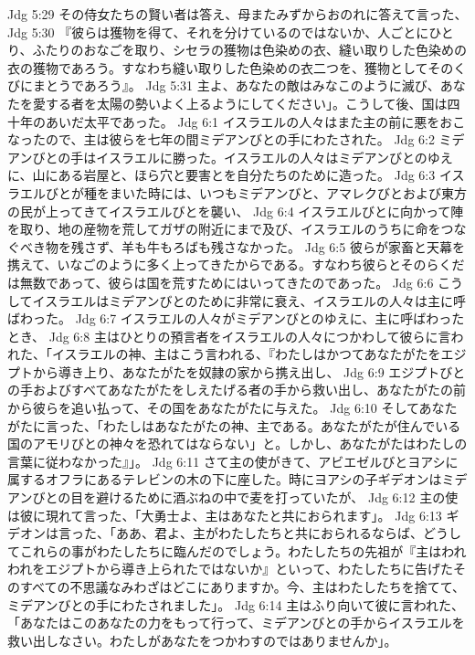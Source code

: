 Jdg 5:29  その侍女たちの賢い者は答え、母またみずからおのれに答えて言った、
Jdg 5:30  『彼らは獲物を得て、それを分けているのではないか、人ごとにひとり、ふたりのおなごを取り、シセラの獲物は色染めの衣、縫い取りした色染めの衣の獲物であろう。すなわち縫い取りした色染めの衣二つを、獲物としてそのくびにまとうであろう』。
Jdg 5:31  主よ、あなたの敵はみなこのように滅び、あなたを愛する者を太陽の勢いよく上るようにしてください」。こうして後、国は四十年のあいだ太平であった。
Jdg 6:1  イスラエルの人々はまた主の前に悪をおこなったので、主は彼らを七年の間ミデアンびとの手にわたされた。
Jdg 6:2  ミデアンびとの手はイスラエルに勝った。イスラエルの人々はミデアンびとのゆえに、山にある岩屋と、ほら穴と要害とを自分たちのために造った。
Jdg 6:3  イスラエルびとが種をまいた時には、いつもミデアンびと、アマレクびとおよび東方の民が上ってきてイスラエルびとを襲い、
Jdg 6:4  イスラエルびとに向かって陣を取り、地の産物を荒してガザの附近にまで及び、イスラエルのうちに命をつなぐべき物を残さず、羊も牛もろばも残さなかった。
Jdg 6:5  彼らが家畜と天幕を携えて、いなごのように多く上ってきたからである。すなわち彼らとそのらくだは無数であって、彼らは国を荒すためにはいってきたのであった。
Jdg 6:6  こうしてイスラエルはミデアンびとのために非常に衰え、イスラエルの人々は主に呼ばわった。
Jdg 6:7  イスラエルの人々がミデアンびとのゆえに、主に呼ばわったとき、
Jdg 6:8  主はひとりの預言者をイスラエルの人々につかわして彼らに言われた、「イスラエルの神、主はこう言われる、『わたしはかつてあなたがたをエジプトから導き上り、あなたがたを奴隷の家から携え出し、
Jdg 6:9  エジプトびとの手およびすべてあなたがたをしえたげる者の手から救い出し、あなたがたの前から彼らを追い払って、その国をあなたがたに与えた。
Jdg 6:10  そしてあなたがたに言った、「わたしはあなたがたの神、主である。あなたがたが住んでいる国のアモリびとの神々を恐れてはならない」と。しかし、あなたがたはわたしの言葉に従わなかった』」。
Jdg 6:11  さて主の使がきて、アビエゼルびとヨアシに属するオフラにあるテレビンの木の下に座した。時にヨアシの子ギデオンはミデアンびとの目を避けるために酒ぶねの中で麦を打っていたが、
Jdg 6:12  主の使は彼に現れて言った、「大勇士よ、主はあなたと共におられます」。
Jdg 6:13  ギデオンは言った、「ああ、君よ、主がわたしたちと共におられるならば、どうしてこれらの事がわたしたちに臨んだのでしょう。わたしたちの先祖が『主はわれわれをエジプトから導き上られたではないか』といって、わたしたちに告げたそのすべての不思議なみわざはどこにありますか。今、主はわたしたちを捨てて、ミデアンびとの手にわたされました」。
Jdg 6:14  主はふり向いて彼に言われた、「あなたはこのあなたの力をもって行って、ミデアンびとの手からイスラエルを救い出しなさい。わたしがあなたをつかわすのではありませんか」。
